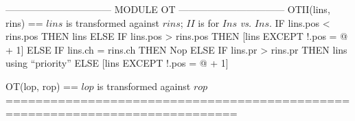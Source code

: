 \documentclass{article}
\begin{document}
\begin{tla}
--------------------------------- MODULE OT ---------------------------------
OTII(lins, rins) == \* $lins$ is transformed against $rins$; $II$ is for $Ins$ \emph{vs.} $Ins$.
    IF lins.pos < rins.pos THEN lins
    ELSE IF lins.pos > rins.pos
         THEN [lins EXCEPT !.pos = @ + 1]
         ELSE IF lins.ch = rins.ch THEN Nop
              ELSE IF lins.pr > rins.pr THEN lins \* using ``priority''
                   ELSE [lins EXCEPT !.pos = @ + 1]

OT(lop, rop) == \* $lop$ is transformed against $rop$
=============================================================================
\end{tla}
\end{document}
